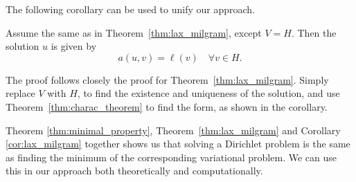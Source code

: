 The following corollary can be used to unify our approach.
\begin{kor}{\quad}
   Assume the same as in Theorem~\ref{thm:lax_milgram}, except $V=H$. Then 
   the solution $u$ is given by~\label{cor:lax_milgram}
   \begin{equation*}
    a(u,v) = \ell(v) \quad \forall v \in H.
   \end{equation*}
   \vspace{-8mm}
\end{kor}
\begin{bev}
    The proof follows closely the proof for Theorem~\ref{thm:lax_milgram}. 
    Simply replace $V$ with $H$, to find the existence and uniqueness of the 
    solution, and use Theorem~\ref{thm:charac_theorem} to find the form, as 
    shown in the corollary.
\end{bev}
Theorem \ref{thm:minimal_property}, Theorem~\ref{thm:lax_milgram} and Corollary 
\ref{cor:lax_milgram} together shows us that solving a Dirichlet problem is 
the same as finding the minimum of the corresponding variational problem. 
We can use this in our approach both theoretically and computationally.